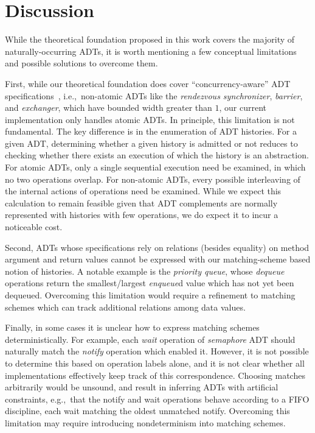 \section{Discussion}
\label{sec:discussion}

While the theoretical foundation proposed in this work covers the majority of
naturally-occurring ADTs, it is worth mentioning a few conceptual limitations
and possible solutions to overcome them.

First, while our theoretical foundation does cover “concurrency-aware” ADT
specifications~\cite{conf/podc/HemedR14}, i.e.,~non-atomic ADTs like the
\emph{rendezvous synchronizer}, \emph{barrier}, and \emph{exchanger}, which
have bounded width greater than $1$, our current implementation only
handles atomic ADTs. In principle, this limitation is not fundamental. The key
difference is in the enumeration of ADT histories. For a given ADT,
determining whether a given history is admitted or not reduces
to checking whether there exists an execution of which the history is an
abstraction. For atomic ADTs, only a single sequential execution need be
examined, in which no two operations overlap. For non-atomic ADTs, every
possible interleaving of the internal actions of operations need be examined.
While we expect this calculation to remain feasible given that ADT complements
are normally represented with histories with few operations, we do expect it to
incur a noticeable cost.

Second, ADTs whose specifications rely on relations (besides equality) on
method argument and return values cannot be expressed with our matching-scheme
based notion of histories. A notable example is the
\emph{priority queue}, whose \emph{dequeue} operations return the
smallest/largest \emph{enqueue}d value which has not yet been dequeued.
Overcoming this limitation would
require a refinement to matching schemes which can track additional relations
among data values.

Finally, in some cases it is unclear how to express matching schemes
deterministically. For example, each \emph{wait} operation of \emph{semaphore}
ADT should naturally match the \emph{notify} operation which enabled it.
However, it is not possible to determine this based on operation labels alone,
and it is not clear whether all implementations effectively keep track of this
correspondence. Choosing matches arbitrarily would be unsound, and
result in inferring ADTs with artificial constraints, e.g.,~that the notify and
wait operations behave according to a FIFO discipline, each wait matching the
oldest unmatched notify. Overcoming this limitation may require introducing
nondeterminism into matching schemes.
